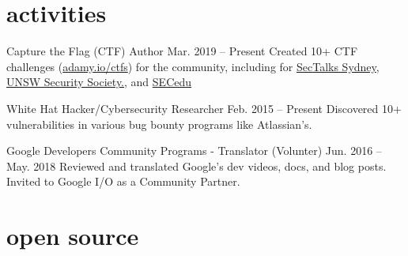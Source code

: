 \documentclass[hidelinks__VERSION__]{adamyi-cv}
\begin{document}

\section{activities}

\begin{entrylist}


\entry
{Capture the Flag (CTF) Author}
{Mar. 2019 -- Present}
{Created 10+ CTF challenges (\href{https://adamy.io/ctfs}{adamy.io/ctfs}) for the community, including for \href{https://www.sectalks.org/sydney/}{SecTalks Sydney}, \href{https://unswsecurity.com/}{UNSW Security Society.}, and \href{https://sec.edu.au/}{SECedu}}


\entry
{White Hat Hacker/Cybersecurity Researcher}
{Feb. 2015 -- Present}
{Discovered 10+ vulnerabilities in various bug bounty programs like Atlassian's.}


\entry
{Google Developers Community Programs - Translator (Volunter)}
{Jun. 2016 -- May. 2018}
{Reviewed and translated Google's dev videos, docs, and blog posts. Invited to Google I/O as a Community Partner.}

\end{entrylist}


\section{open source}
\end{document}
